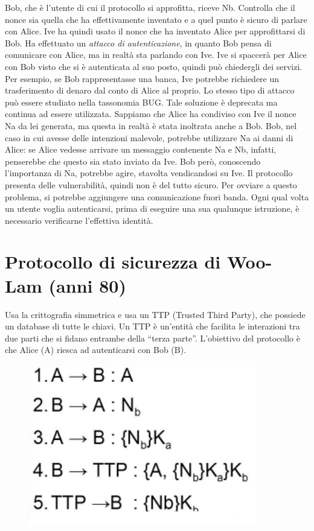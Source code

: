 Bob, che è l’utente di cui il protocollo si approfitta, riceve Nb.
Controlla che il nonce sia quella che
ha effettivamente inventato e a quel punto è sicuro di parlare con Alice.
Ive ha quindi usato il nonce che ha inventato Alice per approfittarsi di
Bob. Ha effettuato un
\textit{attacco di autenticazione}, in quanto Bob pensa di comunicare con
Alice, ma in realtà sta parlando
con Ive.
Ive si spaccerà per Alice con Bob visto che si è autenticata al suo posto,
quindi può chiedergli dei
servizi. Per esempio, se Bob rappresentasse una banca, Ive potrebbe
richiedere un trasferimento
di denaro dal conto di Alice al proprio.
Lo stesso tipo di attacco può essere studiato nella tassonomia BUG. Tale
soluzione è deprecata
ma continua ad essere utilizzata.
Sappiamo che Alice ha condiviso con Ive il nonce Na da lei generata, ma
questa in realtà è stata
inoltrata anche a Bob. Bob, nel caso in cui avesse delle intenzioni
malevole, potrebbe utilizzare Na
ai danni di Alice: se Alice vedesse arrivare un messaggio contenente Na
e Nb, infatti, penserebbe
che questo sia stato inviato da Ive. Bob però, conoscendo l’importanza di
Na, potrebbe agire,
stavolta vendicandosi su Ive.
Il protocollo presenta delle vulnerabilità, quindi non è del tutto sicuro.
Per ovviare a questo
problema, si potrebbe aggiungere una comunicazione fuori banda. Ogni qual
volta un utente voglia
autenticarsi, prima di eseguire una sua qualunque istruzione, è necessario
verificarne l’effettiva
identità.

\section{Protocollo di sicurezza di Woo-Lam (anni 80)}

Usa la crittografia simmetrica e usa un TTP (Trusted Third Party), che
possiede un database di
tutte le chiavi. Un TTP è un'entità che facilita le interazioni tra due
parti che si fidano entrambe
della “terza parte”.
L'obiettivo del protocollo è che Alice (A) riesca ad autenticarsi
con Bob (B).

\begin{figure}[H]
    \centering
    \includegraphics[width=10cm, keepaspectratio]{capitoli/crittografia/imgs/Mulan.png}
\end{figure}


